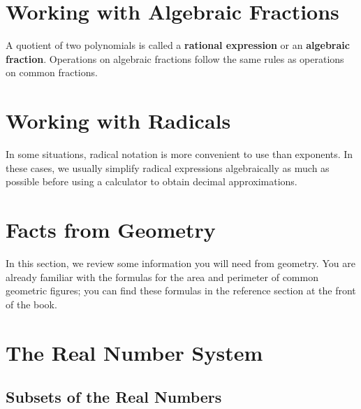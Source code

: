 \documentclass[10pt,]{book}
\newcommand{\terminology}[1]{\textbf{#1}}
\theoremstyle{plain}
\theoremstyle{definition}
\theoremstyle{definition}
\theoremstyle{definition}
\theoremstyle{definition}
\numberwithin{equation}{section}
\begin{document}
\section[Working with Algebraic Fractions]{Working with Algebraic Fractions}\label{appendix-Working-with-Algebraic-Fractions}

            A quotient of two polynomials is called a \terminology{rational expression} or an \terminology{algebraic fraction}. Operations on algebraic fractions follow the same rules as operations on common fractions.
\typeout{************************************************}
\typeout{************************************************}
\section[Working with Radicals]{Working with Radicals}\label{appendix-Working-with-Radicals}
In some situations, radical notation is more convenient to use than exponents. In these cases, we usually simplify radical expressions algebraically as much as possible before using a calculator to obtain decimal approximations.%
\typeout{************************************************}
\typeout{************************************************}
\section[Facts from Geometry]{Facts from Geometry}\label{appendix-Facts-from-Geometry}

            In this section, we review some information you will need from geometry. You are already familiar with the formulas for the area and perimeter of common geometric figures; you can find these formulas in the reference section at the front of the book.
\typeout{************************************************}
\typeout{************************************************}
\section[The Real Number System]{The Real Number System}\label{appendix-The-Real-Number-System}
\typeout{************************************************}
\typeout{************************************************}
\subsection[Subsets of the Real Numbers]{Subsets of the Real Numbers}\label{subsection-10}
\end{document}
